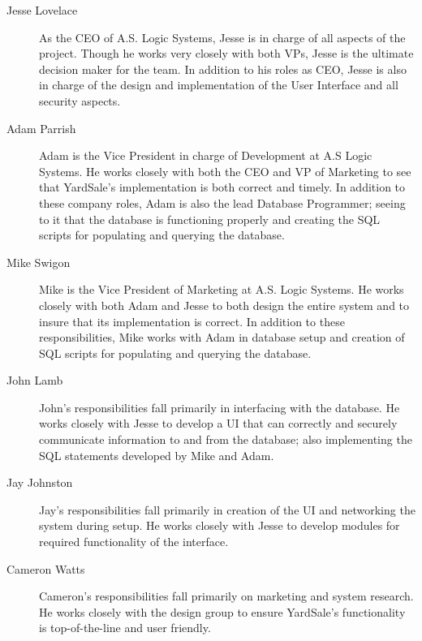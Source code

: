 \documentclass{report}
\begin{document}
            \begin{description}

                \item[Jesse Lovelace] As the CEO of A.S. Logic Systems,
                Jesse is in charge of all aspects of the project.  Though
                he works very closely with both VPs, Jesse is the ultimate
                decision maker for the team.  In addition to his roles as
                CEO, Jesse is also in charge of the design and
                implementation of the User Interface and all security
                aspects.

                \item[Adam Parrish] Adam is the Vice President in charge
                of Development at A.S Logic Systems.  He works closely
                with both the CEO and VP of Marketing to see that
                YardSale's implementation is both correct and timely.  In
                addition to these company roles, Adam is also the lead
                Database Programmer; seeing to it that the database is
                functioning properly and creating the SQL scripts for
                populating and querying the database.

                \item[Mike Swigon] Mike is the Vice President of
                Marketing at A.S. Logic Systems.  He works closely with
                both Adam and Jesse to both design the entire system and
                to insure that its implementation is correct.  In addition
                to these responsibilities, Mike works with Adam in database
                setup and creation of SQL scripts for populating and
                querying the database.

                \item[John Lamb] John's responsibilities fall primarily in
                interfacing with the database.  He works closely with Jesse
                to develop a UI that can correctly and securely
                communicate information to and from the database; also
                implementing the SQL statements developed by Mike and
                Adam.

                \item[Jay Johnston] Jay's responsibilities fall primarily
                in creation of the UI and networking the system during
                setup.  He works closely with Jesse to develop modules
                for required functionality of the interface.

                \item[Cameron Watts] Cameron's responsibilities fall
                primarily on marketing and system research.  He works
                closely with the design group to ensure YardSale's
                functionality is top-of-the-line and user friendly.
            \end{description}
\end{document}
